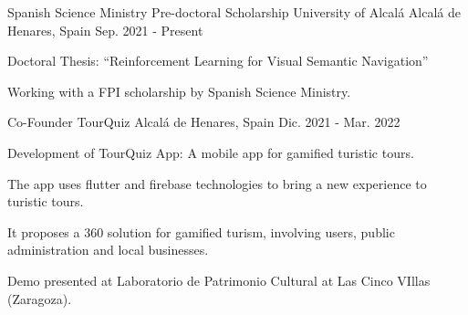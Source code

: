 
\begin{cventries}

    \cventry
    {Spanish Science Ministry Pre-doctoral Scholarship} %
    {University of Alcalá} %
    {Alcalá de Henares, Spain} %
    {Sep. 2021 - Present} %
    {
        \begin{cvitems} %
            \item {Doctoral Thesis: ``Reinforcement Learning for Visual Semantic Navigation”}
            \item {Working with a FPI scholarship by Spanish Science Ministry.}
        \end{cvitems}
    }

    \cventry
    {Co-Founder} %
    {TourQuiz} %
    {Alcalá de Henares, Spain} %
    {Dic. 2021 - Mar. 2022} %
    {
        \begin{cvitems} %
            \item {Development of TourQuiz App: A mobile app for gamified turistic tours.}
            \item {The app uses flutter and firebase technologies to bring a new experience to turistic tours.}
            \item {It proposes a 360 solution for gamified turism, involving users, public administration and local businesses.}
            \item {Demo presented at Laboratorio de Patrimonio Cultural at Las Cinco VIllas (Zaragoza).}
        \end{cvitems}
    }


\end{cventries}
